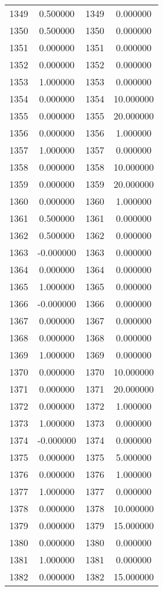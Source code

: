 \documentclass[12pt]{article}
\begin{document}
\begin{longtable}{@{}cccc@{}}
1349 & 0.500000 & 1349 & 0.000000 \\
1350 & 0.500000 & 1350 & 0.000000 \\
1351 & 0.000000 & 1351 & 0.000000 \\
1352 & 0.000000 & 1352 & 0.000000 \\
1353 & 1.000000 & 1353 & 0.000000 \\
1354 & 0.000000 & 1354 & 10.000000 \\
1355 & 0.000000 & 1355 & 20.000000 \\
1356 & 0.000000 & 1356 & 1.000000 \\
1357 & 1.000000 & 1357 & 0.000000 \\
1358 & 0.000000 & 1358 & 10.000000 \\
1359 & 0.000000 & 1359 & 20.000000 \\
1360 & 0.000000 & 1360 & 1.000000 \\
1361 & 0.500000 & 1361 & 0.000000 \\
1362 & 0.500000 & 1362 & 0.000000 \\
1363 & -0.000000 & 1363 & 0.000000 \\
1364 & 0.000000 & 1364 & 0.000000 \\
1365 & 1.000000 & 1365 & 0.000000 \\
1366 & -0.000000 & 1366 & 0.000000 \\
1367 & 0.000000 & 1367 & 0.000000 \\
1368 & 0.000000 & 1368 & 0.000000 \\
1369 & 1.000000 & 1369 & 0.000000 \\
1370 & 0.000000 & 1370 & 10.000000 \\
1371 & 0.000000 & 1371 & 20.000000 \\
1372 & 0.000000 & 1372 & 1.000000 \\
1373 & 1.000000 & 1373 & 0.000000 \\
1374 & -0.000000 & 1374 & 0.000000 \\
1375 & 0.000000 & 1375 & 5.000000 \\
1376 & 0.000000 & 1376 & 1.000000 \\
1377 & 1.000000 & 1377 & 0.000000 \\
1378 & 0.000000 & 1378 & 10.000000 \\
1379 & 0.000000 & 1379 & 15.000000 \\
1380 & 0.000000 & 1380 & 0.000000 \\
1381 & 1.000000 & 1381 & 0.000000 \\
1382 & 0.000000 & 1382 & 15.000000 \\

\end{longtable}
\end{document}
